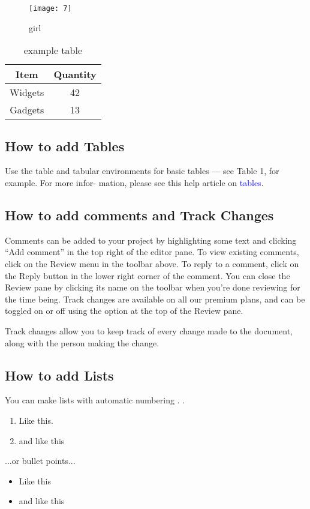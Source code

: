 \documentclass{article}
\begin{document}
\begin{figure}[h]
	\centering
	\texttt{[image: 7]}
	\caption{girl}
	\label{fig:8}
\end{figure}

	\begin{table}[h]
	\centering
	\begin{tabular}{|c|c|}
		\hline
		Item & Quantity \\
		\hline
		Widgets & 42\\
		\hline
		Gadgets & 13 \\
		\hline
	\end{tabular}
   \caption{example table}
	\end{table}



\subsection{How to add Tables}
Use the table and tabular environments for basic tables — see Table 1, for example. For more infor-
mation, please see this help article on \textcolor{blue}{tables}.
	\subsection{How to add comments and Track Changes}
	Comments can be added to your project by highlighting some text and clicking “Add comment” in
	the top right of the editor pane. To view existing comments, click on the Review menu in the toolbar
	above. To reply to a comment, click on the Reply button in the lower right corner of the comment.
	You can close the Review pane by clicking its name on the toolbar when you’re done reviewing for the
	time being.
	Track changes are available on all our premium plans, and can be toggled on or off using the option
	at the top of the Review pane.\par{} Track changes allow you to keep track of every change made to the
	document, along with the person making the change.
	\subsection{How to add Lists}
	You can make lists with automatic numbering . .
	\begin{enumerate}
   \item Like this.
   \item and like this
   \end{enumerate}
   ...or bullet points...
   \begin{itemize}
  \item Like this
  \item and like this 
\end{itemize}
\end{document}
